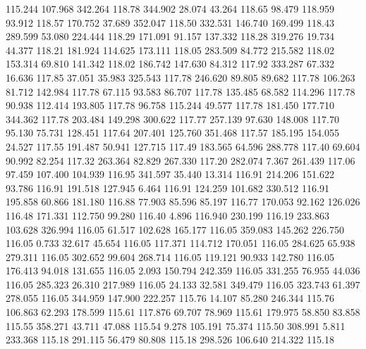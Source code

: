 115.244  107.968  342.264       118.78
 344.902   28.074   43.264       118.65
  98.479  118.959   93.912       118.57
 170.752   37.689  352.047       118.50
 332.531  146.740  169.499       118.43
 289.599   53.080  224.444       118.29
 171.091   91.157  137.332       118.28
 319.276   19.734   44.377       118.21
 181.924  114.625  173.111       118.05
 283.509   84.772  215.582       118.02
 153.314   69.810  141.342       118.02
 186.742  147.630   84.312       117.92
 333.287   67.332   16.636       117.85
  37.051   35.983  325.543       117.78
 246.620   89.805   89.682       117.78
 106.263   81.712  142.984       117.78
  67.115   93.583   86.707       117.78
 135.485   68.582  114.296       117.78
  90.938  112.414  193.805       117.78
  96.758  115.244   49.577       117.78
 181.450  177.710  344.362       117.78
 203.484  149.298  300.622       117.77
 257.139   97.630  148.008       117.70
  95.130   75.731  128.451       117.64
 207.401  125.760  351.468       117.57
 185.195  154.055   24.527       117.55
 191.487   50.941  127.715       117.49
 183.565   64.596  288.778       117.40
  69.604   90.992   82.254       117.32
 263.364   82.829  267.330       117.20
 282.074    7.367  261.439       117.06
  97.459  107.400  104.939       116.95
 341.597   35.440   13.314       116.91
 214.206  151.622   93.786       116.91
 191.518  127.945    6.464       116.91
 124.259  101.682  330.512       116.91
 195.858   60.866  181.180       116.88
  77.903   85.596   85.197       116.77
 170.053   92.162  126.026       116.48
 171.331  112.750   99.280       116.40
   4.896  116.940  230.199       116.19
 233.863  103.628  326.994       116.05
  61.517  102.628  165.177       116.05
 359.083  145.262  226.750       116.05
   0.733   32.617   45.654       116.05
 117.371  114.712  170.051       116.05
 284.625   65.938  279.311       116.05
 302.652   99.604  268.714       116.05
 119.121   90.933  142.780       116.05
 176.413   94.018  131.655       116.05
   2.093  150.794  242.359       116.05
 331.255   76.955   44.036       116.05
 285.323   26.310  217.989       116.05
  24.133   32.581  349.479       116.05
 323.743   61.397  278.055       116.05
 344.959  147.900  222.257       115.76
  14.107   85.280  246.344       115.76
 106.863   62.293  178.599       115.61
 117.876   69.707   78.969       115.61
 179.975   58.850   83.858       115.55
 358.271   43.711   47.088       115.54
   9.278  105.191   75.374       115.50
 308.991    5.811  233.368       115.18
 291.115   56.479   80.808       115.18
 298.526  106.640  214.322       115.18
